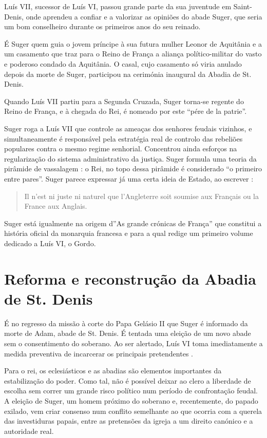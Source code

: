 \documentclass{article}
\begin{document}
Luís VII, sucessor de Luís VI, passou grande parte da sua juventude em
Saint-Denis, onde aprendeu a confiar e a valorizar as opiniões do
abade Suger, que seria um bom conselheiro durante os primeiros anos do
seu reinado.

É Suger quem guia o jovem príncipe à sua futura mulher Leonor de
Aquitânia e a um casamento que traz para o Reino de França a aliança
político-militar do vasto e poderoso condado da Aquitânia. O casal,
cujo casamento só viria anulado depois da morte de Suger, participou
na cerimónia inaugural da Abadia de St. Denis.

Quando Luís VII partiu para a Segunda Cruzada, Suger torna-se regente
do Reino de França, e à chegada do Rei, é nomeado por este ``pére de
la patrie''.

Suger roga a Luís VII que controle as ameaças dos senhores feudais
vizinhos, e simultaneamente é responsável pela estratégia real de
controlo das rebeliões populares contra o mesmo regime
senhorial. Concentrou ainda esforços na regularização do sistema
administrativo da justiça. Suger formula uma teoria da pirâmide de
vassalagem \cite{wikipedia-suger}: o Rei, no topo dessa pirâmide é
considerado ``o primeiro entre pares''. Suger parece expressar já uma
certa ideia de Estado, ao escrever \cite{wikipedia-suger}:

\begin{quote}
Il n’est ni juste ni naturel que l’Angleterre soit soumise aux
Français ou la France aux Anglais.
\end{quote}

Suger está igualmente na origem d''As grande crónicas de França'' que
constitui a história oficial da monarquia francesa e para a qual
redige um primeiro volume dedicado a Luís VI, o Gordo.

\section{Reforma e reconstrução da Abadia de St. Denis}

É no regresso da missão à corte do Papa Gelásio II que Suger é
informado da morte de Adam, abade de St. Denis. É tentada uma eleição
de um novo abade sem o consentimento do soberano. Ao ser alertado,
Luís VI toma imediatamente a medida preventiva de incarcerar os
principais pretendentes \cite{wikipedia-suger}.

Para o rei, os eclesiásticos e as abadias são elementos importantes da
estabilização do poder. Como tal, não é possível deixar ao clero a
liberdade de escolha sem correr um grande risco político num período
de confrontação feudal. A eleição de Suger, um homem próximo do
soberano e, recentemente, do papado exilado, vem criar consenso num
conflito semelhante ao que ocorria com a querela das investiduras
papais, entre as pretensões da igreja a um direito canónico e a
autoridade real.  
\end{document}
